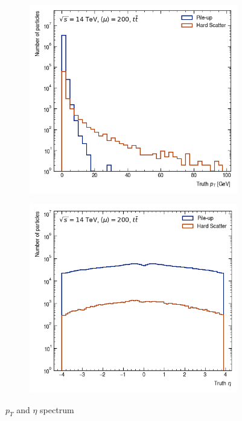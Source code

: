 \begin{figure}[h!]
\begin{subfigure}[b]{0.49\textwidth}
    \centering
    \includegraphics[width=\textwidth]{figures/pt-hist.png}
    \caption{}
    \label{subfig:pt-spectrum}
\end{subfigure}
\begin{subfigure}[b]{0.49\textwidth}
    \centering
    \includegraphics[width=\textwidth]{figures/eta-hist.png}
    \caption{}
    \label{subfig:eta-spectrum}
\end{subfigure}
    \caption{$p_T$ and $\eta$ spectrum}
    \label{fig:pt-eta-spectrum}
\end{figure}

